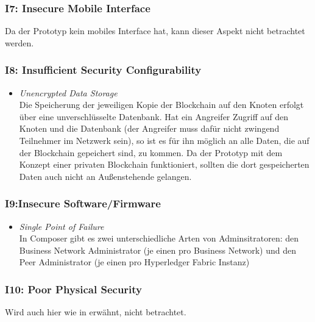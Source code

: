         \subsubsection*{I7: Insecure Mobile Interface}
            Da der Prototyp kein mobiles Interface hat, kann dieser Aspekt nicht betrachtet werden.
            
        \subsubsection*{I8: Insufficient Security Configurability}
            \begin{itemize}[leftmargin=0cm,label={}]
    	        \item \emph{Unencrypted Data Storage}\label{vuln:prototype_db}\\
                    Die Speicherung der jeweiligen Kopie der Blockchain auf den Knoten erfolgt über eine unverschlüsselte Datenbank. 
                    Hat ein Angreifer Zugriff auf den Knoten und die Datenbank (der Angreifer muss dafür nicht zwingend Teilnehmer im Netzwerk sein), so ist es für ihn möglich an alle Daten, die auf der Blockchain gepeichert sind, zu kommen. 
                    Da der Prototyp mit dem Konzept einer privaten Blockchain funktioniert, sollten die dort gespeicherten Daten auch nicht an Außenstehende gelangen.
            \end{itemize}
            
        \subsubsection*{I9:Insecure Software/Firmware}
            \begin{itemize}[leftmargin=0cm,label={}]
    	        \item \emph{Single Point of Failure}\label{vuln:prototype_spf}\\
                    In Composer gibt es zwei unterschiedliche Arten von Adminsitratoren: den Business Network Administrator (je einen pro Business Network) und den Peer Administrator (je einen pro Hyperledger Fabric Instanz)
            \end{itemize}
            
        \subsubsection*{I10: Poor Physical Security}
            Wird auch hier wie in  erwähnt, nicht betrachtet.
    

